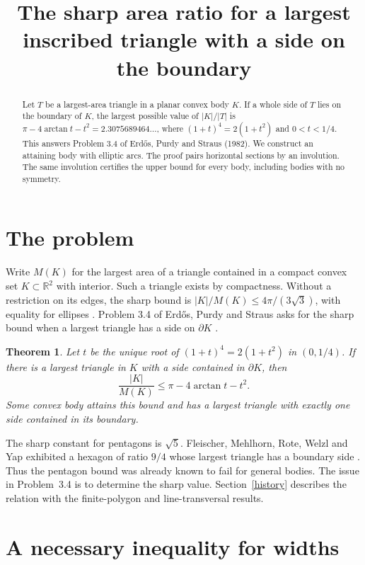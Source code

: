 \documentclass[11pt]{article}
\title{The sharp area ratio for a largest inscribed triangle with a side on the boundary}
\author{}
\date{}
\newtheorem{theorem}{Theorem}
\newcommand{\area}[1]{\lvert #1\rvert}
\begin{document}
\maketitle
\vspace{-2.5em}
\begin{abstract}
Let $T$ be a largest-area triangle in a planar convex body $K$.
If a whole side of $T$ lies on the boundary of $K$, the largest possible
value of $\area K/\area T$ is $\pi-4\arctan t-t^2=2.3075689464\ldots$,
where $(1+t)^4=2(1+t^2)$ and $0<t<1/4$.
This answers Problem 3.4 of Erd\H{o}s, Purdy and Straus (1982).
We construct an attaining body with elliptic arcs. The proof pairs
horizontal sections by an involution. The same involution certifies the
upper bound for every body, including bodies with no symmetry.
\end{abstract}

\section{The problem}

Write $M(K)$ for the largest area of a triangle contained in a compact
convex set $K\subset\mathbb R^2$ with interior. Such a triangle exists
by compactness. Without a restriction on its edges, the sharp bound is
$\area K/M(K)\le4\pi/(3\sqrt3)$, with equality for ellipses
\cite[Theorem 1.2]{EPS}. Problem 3.4 of Erd\H{o}s, Purdy and Straus
asks for the sharp bound when a largest triangle has a side on
$\partial K$ \cite[p.~52]{EPS}.

\begin{theorem}\label{main}
Let $t$ be the unique root of $(1+t)^4=2(1+t^2)$ in $(0,1/4)$.
If there is a largest triangle in $K$ with a side contained in
$\partial K$, then
\[
 \frac{\area K}{M(K)}\le \pi-4\arctan t-t^2.
\]
Some convex body attains this bound and has a largest triangle with
exactly one side contained in its boundary.
\end{theorem}

The sharp constant for pentagons is $\sqrt5$. Fleischer, Mehlhorn, Rote,
Welzl and Yap exhibited a hexagon of ratio $9/4$ whose largest triangle
has a boundary side \cite[Appendix, Lemma A.4]{FMRWY}. Thus the
pentagon bound was already known to fail for general bodies. The issue
in Problem~3.4 is to determine the sharp value. Section~\ref{history}
describes the relation with the finite-polygon and line-transversal results.

\section{A necessary inequality for widths}\label{necessary}
\end{document}
